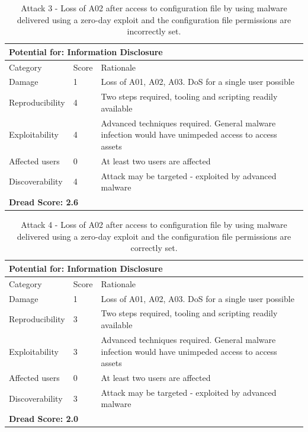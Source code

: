 \documentclass [11pt, proquest] {uwthesis}[2020/02/24]
\begin{document}
\begin{table}[H]
\label{attack3-hsm}
\begin{tabular}{|m{3cm}|m{.9cm}|p{27em} |}
\multicolumn{3}{l}{Potential for: Information Disclosure}                   \\
\hline
Category & Score & Rationale \\
\hline
Damage          & 1     & Loss of A01, A02, A03. DoS for a single user possible            \\
\hline
Reproducibility & 4     & Two steps required, tooling and scripting readily available    \\
\hline
Exploitability & 4      & Advanced techniques required. General malware infection would have unimpeded access to access assets  \\
\hline
Affected users  & 0     & At least two users are affected                      \\
\hline
Discoverability & 4     & Attack may be targeted - exploited by advanced malware \\
\hline
\multicolumn{3}{l}{\textbf{Dread Score: 2.6}} 
\end{tabular}
\caption{Attack 3 - Loss of A02 after access to configuration file by using malware delivered using a zero-day exploit and the configuration file permissions are incorrectly set.}
\end{table}

\begin{table}[H]
\label{attack4-hsm}
\begin{tabular}{|m{3cm}|m{.9cm}|p{27em} |}
\multicolumn{3}{l}{Potential for: Information Disclosure}                   \\
\hline
Category & Score & Rationale \\
\hline
Damage          & 1     & Loss of A01, A02, A03. DoS for a single user possible            \\
\hline
Reproducibility & 3     & Two steps required, tooling and scripting readily available    \\
\hline
Exploitability & 3      & Advanced techniques required. General malware infection would have unimpeded access to access assets  \\
\hline
Affected users  & 0     & At least two users are affected                      \\
\hline
Discoverability & 3     & Attack may be targeted - exploited by advanced malware \\
\hline
\multicolumn{3}{l}{\textbf{Dread Score: 2.0}} 
\end{tabular}
\caption{Attack 4 - Loss of A02 after access to configuration file by using malware delivered using a zero-day exploit and the configuration file permissions are correctly set.}
\end{table}
\end{document}

